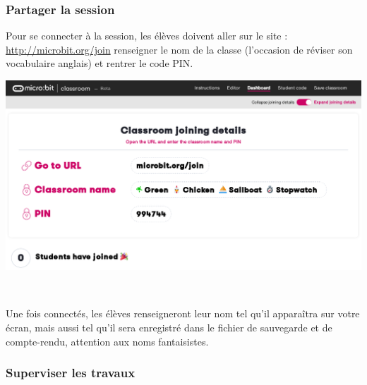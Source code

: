 \vspace{5mm}

\subsubsection{Partager la session}

\begin{methode}
    Pour se connecter à la session, les élèves doivent aller sur le site :  \url{http://microbit.org/join}
     renseigner le nom de la classe (l'occasion de réviser son vocabulaire anglais)
    et rentrer le code PIN.
    \vspace{5mm}

    \centerline{\includegraphics[width=0.7\linewidth]{res/classroom_dashboard2.png}}
    
\end{methode}


\newpage
\vspace{5mm}~\\

\begin{remarque}
    Une fois connectés, les élèves renseigneront leur nom tel qu'il apparaîtra sur votre écran,
    mais aussi tel qu'il sera enregistré dans le fichier de sauvegarde et de compte-rendu, attention
    aux noms fantaisistes.
    
\end{remarque}

\vspace{5mm}

\subsubsection{Superviser les travaux}

